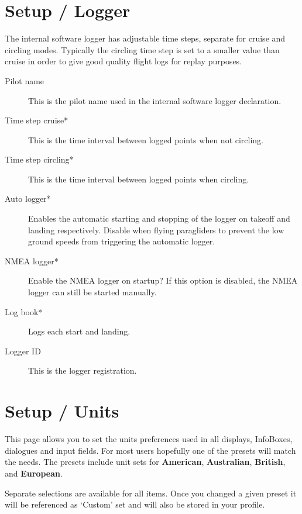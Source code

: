 \section{Setup / Logger} \label{conf:logger}

The internal software logger has adjustable time steps, separate for
cruise and circling modes.  
Typically the circling time step is set to a smaller value
than cruise in order to give good quality flight logs for replay
purposes.

\begin{description}
\item[Pilot name]  This is the pilot name used in the internal software logger 
  declaration.
\item[Time step cruise*]  This is the time interval between logged points when 
  not circling. 
\item[Time step circling*]  This is the time interval between logged points when 
  circling. 
\item[Auto logger*]  Enables the automatic starting and stopping of the logger
  on takeoff and landing respectively. Disable when flying paragliders to prevent 
  the low ground speeds from triggering the automatic logger.
\item[NMEA logger*]  Enable the NMEA logger on startup? If this option is disabled, 
  the NMEA logger can still be started manually.
\item[Log book*]  Logs each start and landing.
\item[Logger ID]  This is the logger registration.
\end{description}


\section{Setup / Units}

This page allows you to set the units preferences used in all
displays, InfoBoxes, dialogues and input fields.  
For most users hopefully one of the presets will match the needs.  The presets 
include unit sets for {\bf American}, {\bf Australian}, {\bf British}, 
and {\bf European}.

Separate selections are available for all items. Once you changed a given preset it 
will be referenced as `Custom' set and will also be stored in your profile.

